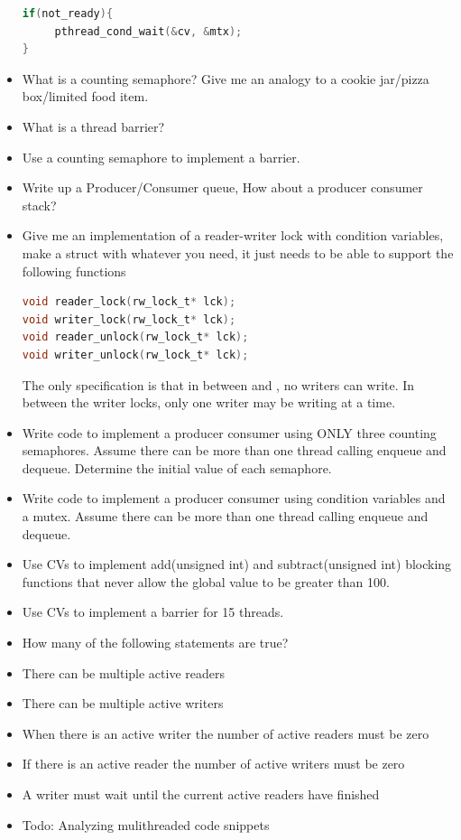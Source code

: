 \begin{itemize}
\begin{lstlisting}[language=C]
if(not_ready){
     pthread_cond_wait(&cv, &mtx);
}
\end{lstlisting}

\item
  What is a counting semaphore? Give me an analogy to a cookie jar/pizza box/limited food item.
\item
  What is a thread barrier?
\item
  Use a counting semaphore to implement a barrier.
\item
  Write up a Producer/Consumer queue, How about a producer consumer stack?
\item
  Give me an implementation of a reader-writer lock with condition variables, make a struct with whatever you need, it just needs to be able to support the following functions

\begin{lstlisting}[language=C]
void reader_lock(rw_lock_t* lck);
void writer_lock(rw_lock_t* lck);
void reader_unlock(rw_lock_t* lck);
void writer_unlock(rw_lock_t* lck);
\end{lstlisting}

  The only specification is that in between  and , no writers can write. In between the writer locks, only one writer may be writing at a time.
\item
  Write code to implement a producer consumer using ONLY three counting semaphores. Assume there can be more than one thread calling enqueue and dequeue. Determine the initial value of each semaphore.
\item
  Write code to implement a producer consumer using condition variables and a mutex. Assume there can be more than one thread calling enqueue and dequeue.
\item
  Use CVs to implement add(unsigned int) and subtract(unsigned int) blocking functions that never allow the global value to be greater than 100.
\item
  Use CVs to implement a barrier for 15 threads.
\item
  How many of the following statements are true?
\item
There can be multiple active readers
\item
There can be multiple active writers
\item
When there is an active writer the number of active readers must be zero
\item
If there is an active reader the number of active writers must be zero
\item
A writer must wait until the current active readers have finished
\item
  Todo: Analyzing mulithreaded code snippets
\end{itemize}



